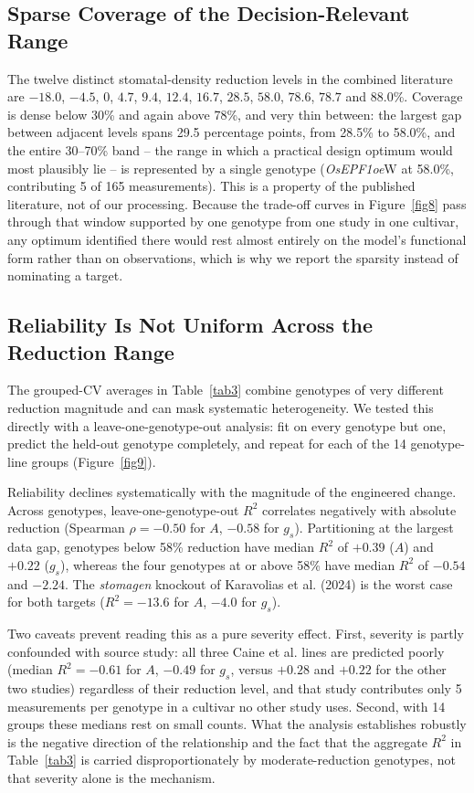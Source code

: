 \documentclass[runningheads]{llncs}
\begin{document}
\subsection{Sparse Coverage of the Decision-Relevant Range}\label{sec:gap}

The twelve distinct stomatal-density reduction levels in the combined literature are $-18.0$, $-4.5$, $0$, $4.7$, $9.4$, $12.4$, $16.7$, $28.5$, $58.0$, $78.6$, $78.7$ and $88.0$\%. Coverage is dense below 30\% and again above 78\%, and very thin between: the largest gap between adjacent levels spans 29.5 percentage points, from 28.5\% to 58.0\%, and the entire 30--70\% band -- the range in which a practical design optimum would most plausibly lie -- is represented by a single genotype (\textit{OsEPF1oe}W at 58.0\%, contributing 5 of 165 measurements). This is a property of the published literature, not of our processing. Because the trade-off curves in Figure~\ref{fig8} pass through that window supported by one genotype from one study in one cultivar, any optimum identified there would rest almost entirely on the model's functional form rather than on observations, which is why we report the sparsity instead of nominating a target.

\subsection{Reliability Is Not Uniform Across the Reduction Range}\label{sec:genoreliability}

The grouped-CV averages in Table~\ref{tab3} combine genotypes of very different reduction magnitude and can mask systematic heterogeneity. We tested this directly with a leave-one-genotype-out analysis: fit on every genotype but one, predict the held-out genotype completely, and repeat for each of the 14 genotype-line groups (Figure~\ref{fig9}).

Reliability declines systematically with the magnitude of the engineered change. Across genotypes, leave-one-genotype-out $R^{2}$ correlates negatively with absolute reduction (Spearman $\rho=-0.50$ for $A$, $-0.58$ for $g_s$). Partitioning at the largest data gap, genotypes below 58\% reduction have median $R^{2}$ of $+0.39$ ($A$) and $+0.22$ ($g_s$), whereas the four genotypes at or above 58\% have median $R^{2}$ of $-0.54$ and $-2.24$. The \textit{stomagen} knockout of Karavolias et al. (2024) is the worst case for both targets ($R^{2}=-13.6$ for $A$, $-4.0$ for $g_s$).

Two caveats prevent reading this as a pure severity effect. First, severity is partly confounded with source study: all three Caine et al. lines are predicted poorly (median $R^{2}=-0.61$ for $A$, $-0.49$ for $g_s$, versus $+0.28$ and $+0.22$ for the other two studies) regardless of their reduction level, and that study contributes only 5 measurements per genotype in a cultivar no other study uses. Second, with 14 groups these medians rest on small counts. What the analysis establishes robustly is the negative direction of the relationship and the fact that the aggregate $R^{2}$ in Table~\ref{tab3} is carried disproportionately by moderate-reduction genotypes, not that severity alone is the mechanism.
\end{document}
